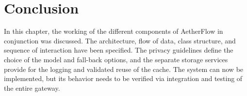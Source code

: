 \documentclass{FastFyp}
\begin{document}
\section{Conclusion}
In this chapter, the working of the different components of AetherFlow in conjunction was discussed. The architecture, flow of data, class structure, and sequence of interaction have been specified. The privacy guidelines define the choice of the model and fall-back options, and the separate storage services provide for the logging and validated reuse of the cache. The system can now be implemented, but its behavior needs to be verified via integration and testing of the entire gateway.



\begingroup
\setlength{\emergencystretch}{2em}


\endgroup
\end{document}
